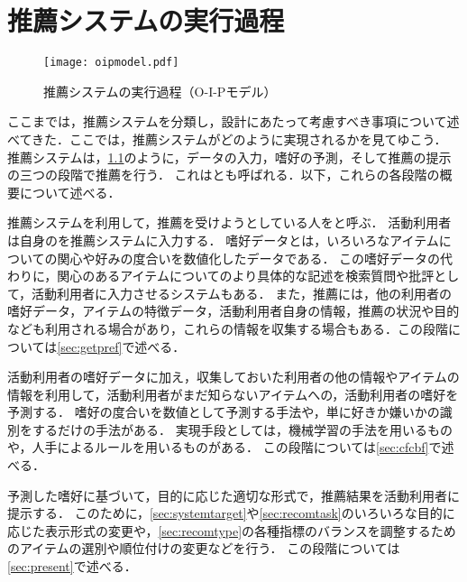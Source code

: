 \chapter{推薦システムの実行過程}
\label{chap:oipmodel}

\begin{figure}
\centering
\texttt{[image: oipmodel.pdf]}
\caption{推薦システムの実行過程（O-I-Pモデル）}
\label{fig:cfscheme}
\end{figure}

ここまでは，推薦システムを分類し，設計にあたって考慮すべき事項について述べてきた．ここでは，推薦システムがどのように実現されるかを見てゆこう．
推薦システムは，\ref{fig:cfscheme}のように，データの入力，嗜好の予測，そして推薦の提示の三つの段階で推薦を行う．
これは\cite{sigchi:03:01}とも呼ばれる．以下，これらの各段階の概要について述べる．

\begin{description}[style=nextline]
\item[データの入力]
推薦システムを利用して，推薦を受けようとしている人をと呼ぶ．
活動利用者は自身のを推薦システムに入力する．
嗜好データとは，いろいろなアイテムについての関心や好みの度合いを数値化したデータである．
この嗜好データの代わりに，関心のあるアイテムについてのより具体的な記述を検索質問や批評として，活動利用者に入力させるシステムもある．
また，推薦には，他の利用者の嗜好データ，アイテムの特徴データ，活動利用者自身の情報，推薦の状況や目的なども利用される場合があり，これらの情報を収集する場合もある．この段階については\ref{sec:getpref}で述べる．
\item[嗜好の予測]
活動利用者の嗜好データに加え，収集しておいた利用者の他の情報やアイテムの情報を利用して，活動利用者がまだ知らないアイテムへの，活動利用者の嗜好を予測する．
嗜好の度合いを数値として予測する手法や，単に好きか嫌いかの識別をするだけの手法がある．
実現手段としては，機械学習の手法を用いるものや，人手によるルールを用いるものがある．
この段階については\ref{sec:cfcbf}で述べる．
\item[推薦の提示]
予測した嗜好に基づいて，目的に応じた適切な形式で，推薦結果を活動利用者に提示する．
このために，\ref{sec:systemtarget}や\ref{sec:recomtask}のいろいろな目的に応じた表示形式の変更や，\ref{sec:recomtype}の各種指標のバランスを調整するためのアイテムの選別や順位付けの変更などを行う．
この段階については\ref{sec:present}で述べる．
\end{description}
